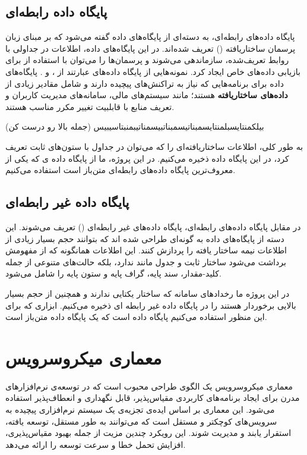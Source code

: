 \subsection{پایگاه داده رابطه‌ای}
پایگاه داده‌های رابطه‌ای، به دسته‌ای از پایگاه‌های داده گفته می‌شود که بر مبنای زبان پرسمان ساختاریافته () تعریف شده‌اند. در این پایگاه‌های داده، اطلاعات در جداولی با روابط تعریف‌شده، سازماندهی می‌شوند و پرسمان‌ها را می‌توان با استفاده از  برای بازیابی داده‌های خاص ایجاد کرد. نمونه‌هایی از پایگاه داده‌های  عبارتند از ،  و . پایگاه‌های داده  برای برنامه‌هایی که نیاز به تراکنش‌های پیچیده دارند و شامل مقادیر زیادی از \textbf{داده‌های ساختاریافته} هستند؛ مانند سیستم‌های مالی، سامانه‌های مدیریت کاربران و تعریف منابع با قابلبیت تغییر مکرر مناسب هستند.

بیلکمنتایسبلمنتایسمبناتیسمبناتبیسمناتیبمنبتاسیبیس (جمله بالا رو درست کن)


به طور کلی، اطلاعات ساختاریافته‌ای را که می‌‌توان در جداول با ستون‌های ثابت تعریف کرد، در این پایگاه داده ذخیره می‌کنیم. در این پروژه، ما از پایگاه داده ‌ی که یکی از معروف‌ترین پایگاه داده‌های رابطه‌ای متن‌باز است استفاده می‌کنیم. 
\subsection{پایگاه داده غیر‌ رابطه‌ای}
در مقابل پایگاه‌ داده‌های رابطه‌ای، پایگاه داده‌های غیر رابطه‌ای () تعریف می‌شوند. این دسته از پایگاه‌های داده به گونه‌ای طراحی شده ‌اند که بتوانند حجم بسیار زیادی از اطلاعات نیمه ساختار یافته را پردازش کنند. این اطلاعات همانگونه که از مفهومش برداشت می‌شود ساختار ثابت و جدول مانند ندارد، بلکه حالت‌های متنوعی از جمله کلید-مقدار، سند پایه، گراف پایه و ستون پایه را شامل می‌شود\cite{Stonebraker2010}.

در این پروژه ما رخدادهای سامانه که ساختار یکتایی ندارند و همچنین از حجم بسیار بالایی برخوردار هستند را در پایگاه داده غیر رابطه ای ذخیره می‌کنیم. ابزاری که برای این منظور استفاده می‌کنیم پایگاه داده  است که یک پایگاه داده متن‌باز است.

\section{معماری میکروسرویس}
معماری میکروسرویس یک الگوی طراحی محبوب است که در توسعه‌ی نرم‌افزار‌های مدرن برای ایجاد برنامه‌های کاربردی مقیاس‌پذیر، قابل نگهداری و انعطاف‌پذیر استفاده می‌شود. این معماری بر اساس ایده‌ی تجزیه‌ی یک سیستم نرم‌افزاری پیچیده به سرویس‌های کوچکتر و مستقل است که می‌توانند به طور مستقل، توسعه یافته، استقرار یابند و مدیریت شوند. این رویکرد چندین مزیت از جمله بهبود مقیاس‌پذیری، افزایش تحمل خطا و سرعت توسعه را ارائه می‌دهد.

